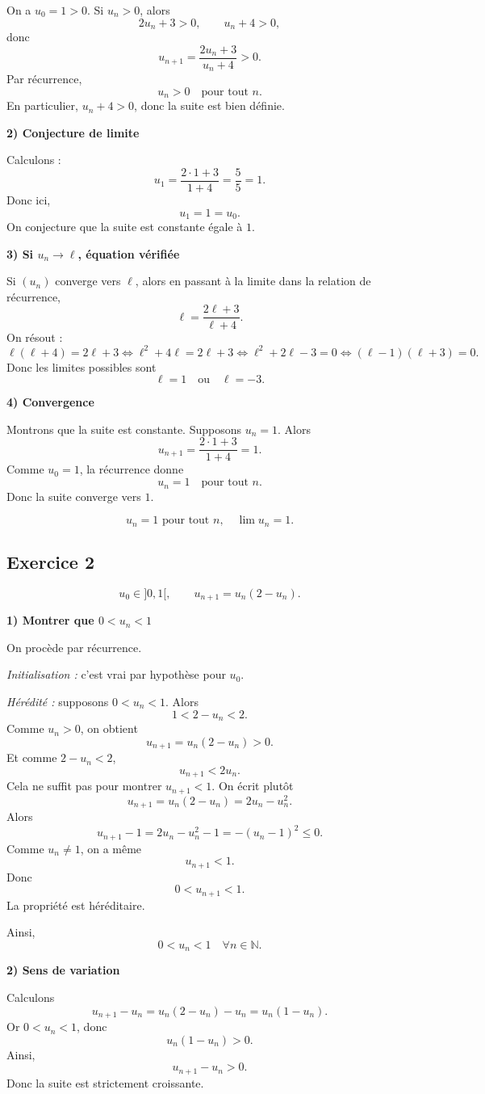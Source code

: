 \documentclass[11pt,a4paper]{article}
\newcommand{\N}{\mathbb{N}}
\begin{document}
On a \(u_0=1>0\).  
Si \(u_n>0\), alors
\[
2u_n+3>0,\qquad u_n+4>0,
\]
donc
\[
u_{n+1}=\frac{2u_n+3}{u_n+4}>0.
\]
Par récurrence,
\[
u_n>0 \quad \text{pour tout } n.
\]
En particulier, \(u_n+4>0\), donc la suite est bien définie.

\textbf{2) Conjecture de limite}

Calculons :
\[
u_1=\frac{2\cdot1+3}{1+4}=\frac55=1.
\]
Donc ici,
\[
u_1=1=u_0.
\]
On conjecture que la suite est constante égale à \(1\).

\textbf{3) Si \(u_n\to \ell\), équation vérifiée}

Si \((u_n)\) converge vers \(\ell\), alors en passant à la limite dans la relation de récurrence,
\[
\ell=\frac{2\ell+3}{\ell+4}.
\]
On résout :
\[
\ell(\ell+4)=2\ell+3
\iff \ell^2+4\ell=2\ell+3
\iff \ell^2+2\ell-3=0
\iff (\ell-1)(\ell+3)=0.
\]
Donc les limites possibles sont
\[
\ell=1 \quad \text{ou} \quad \ell=-3.
\]

\textbf{4) Convergence}

Montrons que la suite est constante.  
Supposons \(u_n=1\). Alors
\[
u_{n+1}=\frac{2\cdot1+3}{1+4}=1.
\]
Comme \(u_0=1\), la récurrence donne
\[
u_n=1 \quad \text{pour tout } n.
\]
Donc la suite converge vers \(1\).

\[
\boxed{u_n=1 \text{ pour tout } n,\quad \lim u_n=1.}
\]

\subsection*{Exercice 2}
\[
u_0\in ]0,1[,\qquad u_{n+1}=u_n(2-u_n).
\]

\textbf{1) Montrer que \(0<u_n<1\)}

On procède par récurrence.

\emph{Initialisation :} c'est vrai par hypothèse pour \(u_0\).

\emph{Hérédité :} supposons \(0<u_n<1\). Alors
\[
1<2-u_n<2.
\]
Comme \(u_n>0\), on obtient
\[
u_{n+1}=u_n(2-u_n)>0.
\]
Et comme \(2-u_n<2\),
\[
u_{n+1}<2u_n.
\]
Cela ne suffit pas pour montrer \(u_{n+1}<1\).  
On écrit plutôt
\[
u_{n+1}=u_n(2-u_n)=2u_n-u_n^2.
\]
Alors
\[
u_{n+1}-1=2u_n-u_n^2-1=-(u_n-1)^2\leq 0.
\]
Comme \(u_n\neq 1\), on a même
\[
u_{n+1}<1.
\]
Donc
\[
0<u_{n+1}<1.
\]
La propriété est héréditaire.

Ainsi,
\[
0<u_n<1 \quad \forall n\in\N.
\]

\textbf{2) Sens de variation}

Calculons
\[
u_{n+1}-u_n=u_n(2-u_n)-u_n=u_n(1-u_n).
\]
Or \(0<u_n<1\), donc
\[
u_n(1-u_n)>0.
\]
Ainsi,
\[
u_{n+1}-u_n>0.
\]
Donc la suite est strictement croissante.
\end{document}
